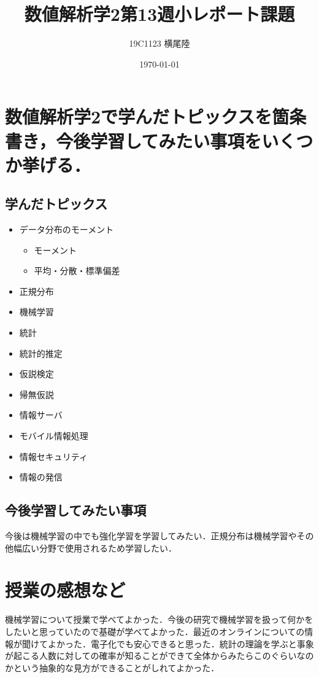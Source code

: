 \documentclass[dvipdfmx]{jsarticle}
\begin{document}
\title{数値解析学2第13週小レポート課題}
\author{19C1123 横尾陸}
\date{\today}
\maketitle

\section{数値解析学2で学んだトピックスを箇条書き，今後学習してみたい事項をいくつか挙げる．}
\subsection{学んだトピックス}
\begin{itemize}
  \item データ分布のモーメント
    \begin{itemize}
      \item モーメント
      \item 平均・分散・標準偏差
    \end{itemize}
  \item 正規分布
  \item 機械学習
  \item 統計
  \item 統計的推定
  \item 仮説検定
  \item 帰無仮説
  \item 情報サーバ
  \item モバイル情報処理
  \item 情報セキュリティ
  \item 情報の発信
\end{itemize}

\subsection{今後学習してみたい事項}
今後は機械学習の中でも強化学習を学習してみたい．正規分布は機械学習やその他幅広い分野で使用されるため学習したい．

\section{授業の感想など}
機械学習について授業で学べてよかった．今後の研究で機械学習を扱って何かをしたいと思っていたので基礎が学べてよかった．最近のオンラインについての情報が聞けてよかった．電子化でも安心できると思った．統計の理論を学ぶと事象が起こる人数に対しての確率が知ることができて全体からみたらこのぐらいなのかという抽象的な見方ができることがしれてよかった．
\end{document}
